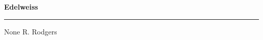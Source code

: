 \documentclass[10pt]{book}
\begin{document}
{
  \samepage
  \raggedbottom
  \raggedright
  \sloppy


  \vspace{0.2in}

  \noindent\begin{minipage}{.1\textwidth}
    \hfill\vspace{0.1in}
  \end{minipage}%
  \noindent\begin{minipage}{.8\textwidth}
    \centering
    \bfseries
    \large Edelweiss
  \end{minipage}%
  \noindent\begin{minipage}{.1\textwidth}
      \hfill\vspace{0.1in}
  \end{minipage}

  \nopagebreak[4]
  \vspace{0.1in}
  \nopagebreak[4]
  \hrule height 0.05ex
  \nopagebreak[4]
  \vspace{-0.05in}

  {\footnotesize None \hfill R. Rodgers }\\
  \vspace{0.01in}



}
\end{document}
